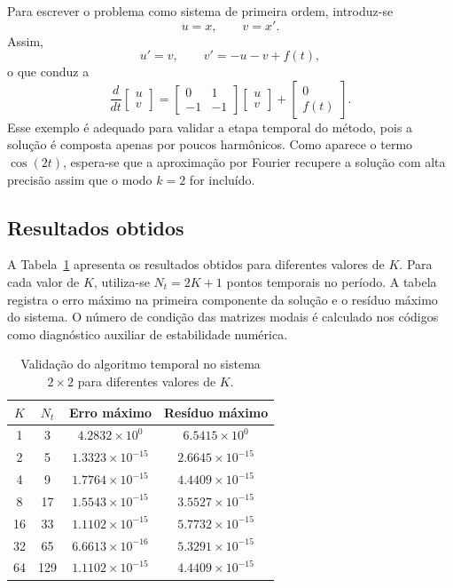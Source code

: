 Para escrever o problema como sistema de primeira ordem, introduz-se
\[
u=x,
\qquad v=x'.
\]
Assim,
\[
u'=v,
\qquad
v'=-u-v+f(t),
\]
o que conduz a
\[
\frac{d}{dt}
\begin{bmatrix}
u\\ v
\end{bmatrix}
=
\begin{bmatrix}
0 & 1\\
-1 & -1
\end{bmatrix}
\begin{bmatrix}
u\\ v
\end{bmatrix}
+
\begin{bmatrix}
0\\ f(t)
\end{bmatrix}.
\]
Esse exemplo é adequado para validar a etapa temporal do método, pois a solução é composta apenas por poucos harmônicos. Como aparece o termo \(\cos(2t)\), espera-se que a aproximação por Fourier recupere a solução com alta precisão assim que o modo \(k=2\) for incluído.

\subsection{Resultados obtidos}

A Tabela~\ref{tab:sistema2x2_modos} apresenta os resultados obtidos para diferentes valores de \(K\). Para cada valor de \(K\), utiliza-se \(N_t=2K+1\) pontos temporais no período. A tabela registra o erro máximo na primeira componente da solução e o resíduo máximo do sistema. O número de condição das matrizes modais é calculado nos códigos como diagnóstico auxiliar de estabilidade numérica.

\begin{table}[h!]
\centering
\caption{Validação do algoritmo temporal no sistema \(2\times2\) para diferentes valores de \(K\).}
\label{tab:sistema2x2_modos}
\begin{tabular}{cccc}
\toprule
\(K\) & \(N_t\) & Erro máximo & Resíduo máximo \\
\midrule
1  & 3   & \(4.2832\times 10^{0}\)  & \(6.5415\times 10^{0}\) \\
2  & 5   & \(1.3323\times 10^{-15}\) & \(2.6645\times 10^{-15}\) \\
4  & 9   & \(1.7764\times 10^{-15}\) & \(4.4409\times 10^{-15}\) \\
8  & 17  & \(1.5543\times 10^{-15}\) & \(3.5527\times 10^{-15}\) \\
16 & 33  & \(1.1102\times 10^{-15}\) & \(5.7732\times 10^{-15}\) \\
32 & 65  & \(6.6613\times 10^{-16}\) & \(5.3291\times 10^{-15}\) \\
64 & 129 & \(1.1102\times 10^{-15}\) & \(4.4409\times 10^{-15}\) \\
\bottomrule
\end{tabular}
\end{table}

